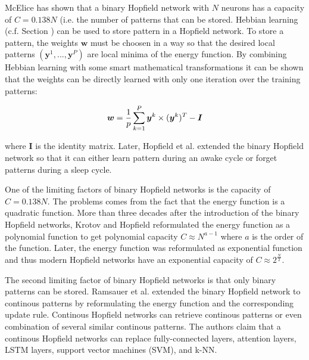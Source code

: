 McElice  has shown that a binary Hopfield network with \(N\) neurons has a capacity of \(C=0.138N\) (i.e. the number of patterns that can be stored.
Hebbian learning (c.f. Section ) can be used to store pattern in a Hopfield network.
To store a pattern, the weights \(\boldsymbol{w}\) must be choosen in a way so that the desired local patterns \((\boldsymbol{y}^1, ..., \boldsymbol{y}^P)\) are local minima of the energy function.
By combining Hebbian learning with some smart mathematical transformations it can be shown that the weights can be directly learned with only one iteration over the training patterns:

\begin{equation}\eqlbl{hf_5}
	\boldsymbol{w} = \frac{1}{p} \sum_{k=1}^{P} \boldsymbol{y}^k \times (\boldsymbol{y}^k)^T - \boldsymbol{I}
\end{equation}

where \(\boldsymbol{I}\) is the identity matrix.
Later, Hopfield et al.  extended the binary Hopfield network so that it can either learn pattern during an awake cycle or forget patterns during a sleep cycle.

One of the limiting factors of binary Hopfield networks is the capacity of \(C=0.138N\).
The problems comes from the fact that the energy function is a quadratic function.
More than three decades after the introduction of the binary Hopfield networks, Krotov and Hopfield  reformulated the energy function as a polynomial function to get polynomial capacity \(C\approx N^{a-1}\) where \(a\) is the order of the function.
Later, the energy function was reformulated as exponential function  and thus modern Hopfield networks have an exponential capacity of \(C\approx 2^{\frac{N}{2}}\).

The second limiting factor of binary Hopfield networks is that only binary patterns can be stored.
Ramsauer et al.  extended the binary Hopfield network to continous patterns by reformulating the energy function and the corresponding update rule.
Continous Hopfield networks can retrieve continous patterns or even combination of several similar continous patterns.
The authors claim that a continous Hopfield networks can replace fully-connected layers, attention layers, LSTM layers, support vector machines (SVM), and k-NN.

